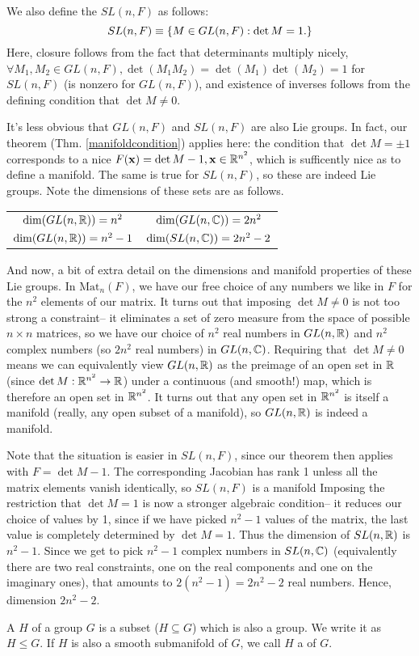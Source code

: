 \begin{defn}
We also define the  $SL(n,F)$ as follows:
\begin{equation}
SL(n,F)\equiv \{M\in GL(n,F): \det M = 1.\}
\end{equation}
Here, closure follows from the fact that determinants multiply nicely, $\forall M_1,M_2\in GL(n,F),\det(M_1M_2)=\det(M_1)\det(M_2)= 1$ for $SL(n,F)$ (is nonzero for $GL(n,F)$), and existence of inverses follows from the defining condition that $\det M\neq 0$.
\end{defn}

It's less obvious that $GL(n,F)$ and $SL(n,F)$ are also Lie groups. In fact, our theorem (Thm. \ref{manifoldcondition}) applies here: the condition that $\det M=\pm 1$ corresponds to a nice $F(\boldsymbol{\mathbf{x}})=\det M -1, \boldsymbol{\mathbf{x}}\in \mathbb{R}^{n^2}$, which is sufficently nice as to define a manifold. The same is true for $SL(n,F)$, so these are indeed Lie groups. Note the dimensions of these sets are as follows.
\begin{center}
\begin{tabular}{c c}
$\dim(GL(n,\mathbb{R}))=n^2$ & $\dim(GL(n,\mathbb{C}))=2n^2$\\
$\dim(GL(n,\mathbb{R}))=n^2-1$ & $\dim(SL(n,\mathbb{C}))=2n^2-2$
\end{tabular}
\end{center}
And now, a bit of extra detail on the dimensions and manifold properties of these Lie groups. In $\text{Mat}_n(F)$, we have our free choice of any numbers we like in $F$ for the $n^2$ elements of our matrix. It turns out that imposing $\det M\neq 0$ is not too strong a constraint-- it eliminates a set of zero measure from the space of possible $n\times n$ matrices, so we have our choice of $n^2$ real numbers in $GL(n,\mathbb{R})$ and $n^2$ complex numbers (so $2n^2$ real numbers) in $GL(n,\mathbb{C})$. Requiring that $\det M \neq 0$ means we can equivalently view $GL(n,\mathbb{R})$ as the preimage of an open set in $\mathbb{R}$ (since $\det M: \mathbb{R}^{n^2}\to \mathbb{R}$) under a continuous (and smooth!) map, which is therefore an open set in $\mathbb{R}^{n^2}$. It turns out that any open set in $\mathbb{R}^{n^2}$ is itself a manifold (really, any open subset of a manifold), so $GL(n,\mathbb{R})$ is indeed a manifold. 

Note that the situation is easier in $SL(n,F)$, since our theorem then applies with $F=\det M - 1$. The corresponding Jacobian has rank 1 unless all the matrix elements vanish identically, so $SL(n,F)$ is a manifold Imposing the restriction that $\det M =1$ is now a stronger algebraic condition-- it reduces our choice of values by 1, since if we have picked $n^2-1$ values of the matrix, the last value is completely determined by $\det M=1$. Thus the dimension of $SL(n,\mathbb{R})$ is $n^2-1$. Since we get to pick $n^2-1$ complex numbers in $SL(n,\mathbb{C})$ (equivalently there are two real constraints, one on the real components and one on the imaginary ones), that amounts to $2(n^2-1)=2n^2-2$ real numbers. Hence, dimension $2n^2-2$.

\begin{defn}
A  $H$ of a group $G$ is a subset ($H\subseteq G$) which is also a group. We write it as $H\leq G$. If $H$ is also a smooth submanifold of $G$, we call $H$ a  of $G$.
\end{defn}
